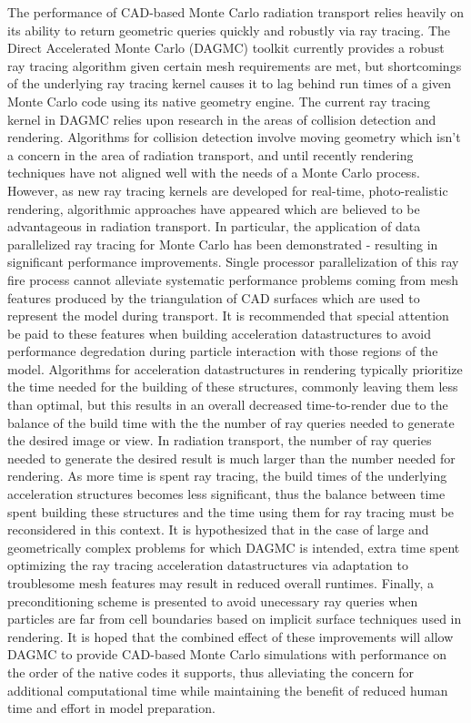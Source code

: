 \documentclass[12pt, a4paper]{article}
\begin{document}
The performance of CAD-based Monte Carlo radiation transport relies heavily on its ability to return geometric queries quickly and robustly via ray tracing. The Direct Accelerated Monte Carlo (DAGMC) toolkit currently provides a robust ray tracing algorithm\cite{Smith_2011} given certain mesh requirements are met, but shortcomings of the underlying ray tracing kernel causes it to lag behind run times of a given Monte Carlo code using its native geometry engine. The current ray tracing kernel in DAGMC relies upon research in the areas of collision detection and rendering. Algorithms for collision detection involve moving geometry which isn't a concern in the area of radiation transport, and until recently rendering techniques have not aligned well with the needs of a Monte Carlo process. However, as new ray tracing kernels are developed for real-time, photo-realistic rendering, algorithmic approaches have appeared which are believed to be advantageous in radiation transport. In particular, the application of data parallelized ray tracing for Monte Carlo has been demonstrated - resulting in significant performance improvements. Single processor parallelization of this ray fire process cannot alleviate systematic performance problems coming from mesh features produced by the triangulation of CAD surfaces which are used to represent the model during transport. It is recommended that special attention be paid to these features when building acceleration datastructures to avoid performance degredation during particle interaction with those regions of the model. Algorithms for acceleration datastructures in rendering typically prioritize the time needed for the building of these structures, commonly leaving them less than optimal, but this results in an overall decreased time-to-render due to the balance of the build time with the the number of ray queries needed to generate the desired image or view. In radiation transport, the number of ray queries needed to generate the desired result is much larger than the number needed for rendering. As more time is spent ray tracing, the build times of the underlying acceleration structures becomes less significant, thus the balance between time spent building these structures and the time using them for ray tracing must be reconsidered in this context. It is hypothesized that in the case of large and geometrically complex problems for which DAGMC is intended, extra time spent optimizing the ray tracing acceleration datastructures via adaptation to troublesome mesh features may result in reduced overall runtimes. Finally, a preconditioning scheme is presented to avoid unecessary ray queries when particles are far from cell boundaries based on implicit surface techniques used in rendering. It is hoped that the combined effect of these improvements will allow DAGMC to provide CAD-based Monte Carlo simulations with performance on the order of the native codes it supports, thus alleviating the concern for additional computational time while maintaining the benefit of reduced human time and effort in model preparation.
\end{document}
